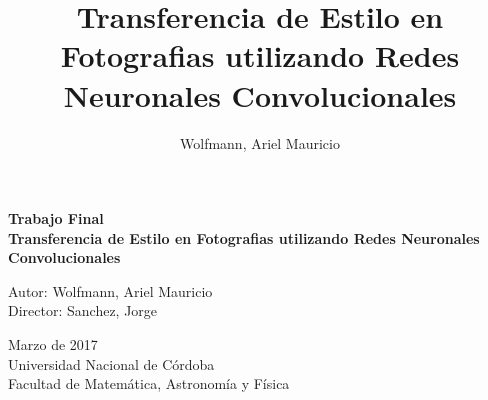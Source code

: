 \documentclass[a4paper,11pt,spanish]{book}
\title{Transferencia de Estilo en Fotografias utilizando Redes Neuronales Convolucionales}   %
\author{Wolfmann, Ariel Mauricio}             %
\begin{document}



\begin{titlepage}
  \begin{center}
  \vspace*{1in}
    \begin{Huge}
    \textbf{Trabajo Final}\\
    \textbf{Transferencia de Estilo en Fotografias utilizando Redes Neuronales Convolucionales} \\
    \end{Huge}
  \end{center}
  \begin{center}
    \begin{large}
      \vspace*{1in}
      Autor: Wolfmann, Ariel Mauricio\\
      Director: Sanchez, Jorge\\
    \end{large}
    \vspace*{0.15in}
     Marzo de 2017\\
    \vspace*{0.15in}
    Universidad Nacional de Córdoba\\
    \vspace*{0.15in}
    Facultad de Matemática, Astronomía y Física\\
    \vspace*{0.6in}
  \end{center}
\end{titlepage}

\pagebreak

\end{document}

